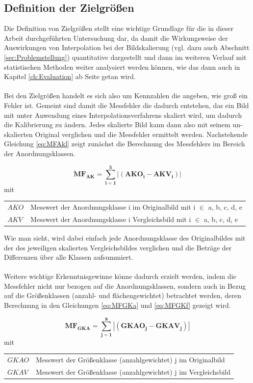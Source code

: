 \documentclass[
fontsize=10pt, 
listof = totoc,
parskip = half	
]{report}
\makeatletter
\newenvironment{conditions}
{\par\vspace{\abovedisplayskip}\noindent\begin{tabular}{>{$}l<{$} @{${}:{}$} l}}
	{\end{tabular}\par\vspace{\belowdisplayskip}}
\makeatother
\begin{document}
\subsection{Definition der Zielgrößen}
\label{subsec:DefZiel}

Die Definition von Zielgrößen stellt eine wichtige Grundlage für die in dieser Arbeit durchgeführten Untersuchung dar, da damit die Wirkungsweise der Auswirkungen von Interpolation bei der Bildskalierung (vgl. dazu auch Abschnitt \ref{sec:Problemstellung}) quantitative dargestellt und dann im weiteren Verlauf mit statistischen Methoden weiter analysiert werden können, wie das dann auch in Kapitel \ref{ch:Evaluation} ab Seite \pageref{ch:Evaluation} getan wird.
\\\\
Bei den Zielgrößen handelt es sich also um Kennzahlen die angeben, wie groß ein Fehler ist. Gemeint sind damit die Messfehler die dadurch entstehen, das ein Bild mit unter Anwendung eines Interpolationsverfahrens skaliert wird, um dadurch die Kalibrierung zu ändern. Jedes skalierte Bild kann dann also mit seinem un-skalierten Original verglichen und die Messfehler ermittelt werden. Nachstehende Gleichung \ref{eq:MFAkl} zeigt zunächst die Berechnung des Messfehlers im Bereich der Anordnungsklassen.

\begin{equation}\label{eq:MFAkl}
	\boxed{\mathbf{MF_{AK}	=	\sum_{i=1}^{5} |\left(AKO_i - AKV_i\right)}|}
\end{equation}
mit
\begin{conditions}
	AKO	&	Messwert der Anordnungsklasse i im Originalbild mit i $\in$ {a, b, c, d, e}\\
	AKV	&	Messwert der Anordnungsklasse i Vergleichsbild mit i $\in$ {a, b, c, d, e}
\end{conditions}

\noindent Wie man sieht, wird dabei einfach jede Anordnungsklasse des Originalbildes mit der des jeweiligen skalierten Vergleichsbildes verglichen und die Beträge der Differenzen über alle Klassen aufsummiert.
\\\\
\noindent Weitere wichtige Erkenntnisgewinne könne dadurch erzielt werden, indem die Messfehler nicht nur bezogen auf die Anordnungsklassen, sondern auch in Bezug auf die Größenklassen (anzahl- und flächengewichtet) betrachtet werden, deren Berechnung in den Gleichungen \ref{eq:MFGKa} und \ref{eq:MFGKf} gezeigt wird.

\begin{equation}\label{eq:MFGKa}
	\boxed{\mathbf{MF_{GKA} = \sum_{j=1}^{8} |\left(GKAO_j - GKAV_j\right)|}}
\end{equation}
mit
\begin{conditions}
	GKAO	&	Messwert der Größenklasse (anzahlgewichtet) j im Originalbild\\
	GKAV	&	Messwert der Größenklasse (anzahlgewichtet) j im Vergleichsbild
\end{conditions}
\end{document}
